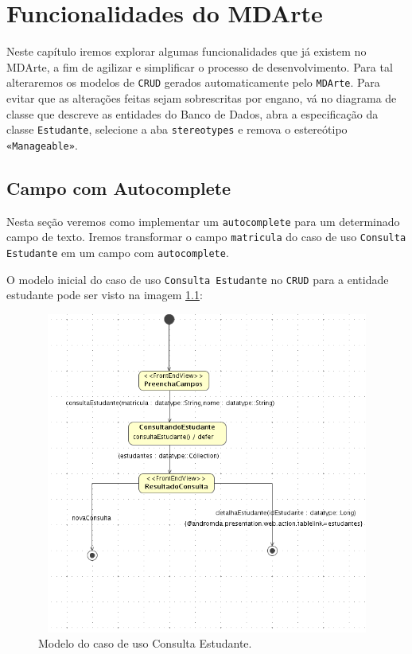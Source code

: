 \chapter{Funcionalidades do MDArte}
Neste capítulo iremos explorar algumas funcionalidades que já existem no MDArte,
a fim de agilizar e simplificar o processo de desenvolvimento. Para tal
alteraremos os modelos de \texttt{CRUD} gerados automaticamente pelo
\texttt{MDArte}. Para evitar que as alterações feitas sejam sobrescritas por
engano, vá no diagrama de classe que descreve as entidades do Banco de Dados,
abra a especificação da classe \texttt{Estudante}, selecione a aba
\texttt{stereotypes} e remova o estereótipo \texttt{«Manageable»}.

\section{Campo com Autocomplete}
Nesta seção veremos como implementar um \texttt{autocomplete} para um
determinado campo de texto. Iremos transformar o campo \texttt{matricula} do
caso de uso \texttt{Consulta Estudante} em um campo com \texttt{autocomplete}.

O modelo inicial do caso de uso \texttt{Consulta Estudante} no  \texttt{CRUD}
para a entidade estudante pode ser visto na imagem \ref{modelo_consulta_estudante}:
\begin{figure}[H]
	\centering
	\includegraphics[width=350pt,height=300pt]{files/imgs/tutorial-mdarte-0028.png}
	\caption{Modelo do caso de uso Consulta Estudante.}
	\label{modelo_consulta_estudante}
\end{figure}

